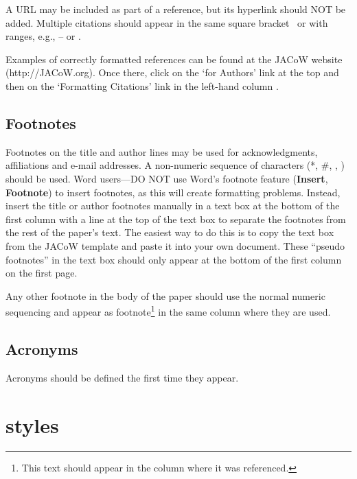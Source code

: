 \documentclass[acus,%
              ]{jacow}
\begin{document}
A URL may be included as part of a reference, but
its hyperlink should NOT be added. Multiple citations should appear in
the same square bracket~\cite{jacow-help, exampl-ref2, exampl-ref3} or
with ranges, e.g., \cite{jacow-help}--\cite{exampl-ref3} or \cite{jacow-help, exampl-ref, exampl-ref2, exampl-ref3, exampl-last}.

Examples of correctly formatted references can be found at the JACoW website (http://JACoW.org). Once there, click on the ‘for Authors’ link at the top and then on the ‘Formatting
Citations’ link in the left-hand column \cite{jacow-help}.

\subsection{Footnotes}

Footnotes on the title and author lines may be used for acknowledgments,
affiliations and e-mail addresses. A non-numeric sequence of characters (*, \#,
\dag, \ddag) should be used.
Word users---DO NOT use Word's footnote feature (\textbf{Insert}, \textbf{Footnote})
to insert footnotes, as this will create formatting problems. Instead, insert
the title or author footnotes manually in a text box at the bottom of the first column with a
line at the top of the text box to separate the footnotes from the rest of
the paper's text.  The easiest way to do this is to copy the text box from
the JACoW template and paste it into your own document.
These “pseudo footnotes” in the text box should only
appear at the bottom of the first column on the first page.

Any other footnote in the body of the paper should use the normal numeric
sequencing and appear as footnote\footnote{This text should appear
in the column where it was referenced.} in the same column where they are used.

\subsection{Acronyms}

Acronyms should be defined the first time they appear.

\section{styles}
\end{document}
